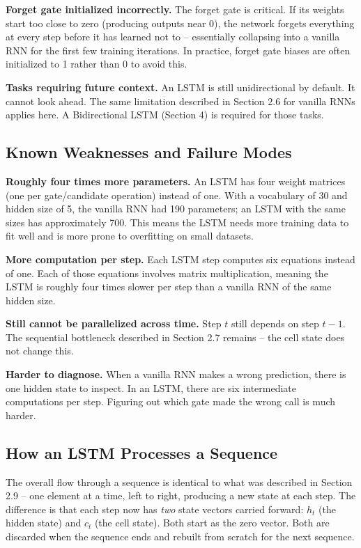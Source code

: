 \textbf{Forget gate initialized incorrectly.} The forget gate is critical. If its
weights start too close to zero (producing outputs near 0), the network forgets
everything at every step before it has learned not to -- essentially collapsing into
a vanilla RNN for the first few training iterations. In practice, forget gate biases
are often initialized to 1 rather than 0 to avoid this.

\textbf{Tasks requiring future context.} An LSTM is still unidirectional by default.
It cannot look ahead. The same limitation described in Section 2.6 for vanilla RNNs
applies here. A Bidirectional LSTM (Section 4) is required for those tasks.

\subsection{Known Weaknesses and Failure Modes}

\textbf{Roughly four times more parameters.} An LSTM has four weight matrices
(one per gate/candidate operation) instead of one. With a vocabulary of 30 and hidden
size of 5, the vanilla RNN had 190 parameters; an LSTM with the same sizes has
approximately 700. This means the LSTM needs more training data to fit well
and is more prone to overfitting on small datasets.

\textbf{More computation per step.} Each LSTM step computes six equations instead
of one. Each of those equations involves matrix multiplication, meaning the LSTM is
roughly four times slower per step than a vanilla RNN of the same hidden size.

\textbf{Still cannot be parallelized across time.} Step $t$ still depends on step
$t-1$. The sequential bottleneck described in Section 2.7 remains -- the cell state
does not change this.

\textbf{Harder to diagnose.} When a vanilla RNN makes a wrong prediction, there is
one hidden state to inspect. In an LSTM, there are six intermediate computations per
step. Figuring out which gate made the wrong call is much harder.

\subsection{How an LSTM Processes a Sequence}

The overall flow through a sequence is identical to what was described in Section 2.9 --
one element at a time, left to right, producing a new state at each step. The difference
is that each step now has \textit{two} state vectors carried forward: $h_t$ (the
hidden state) and $c_t$ (the cell state). Both start as the zero vector. Both are
discarded when the sequence ends and rebuilt from scratch for the next sequence.

